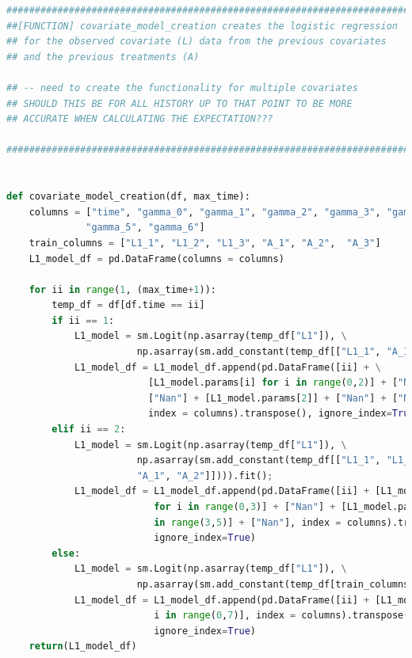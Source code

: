 \begin{lstlisting}[language=Python]
#########################################################################
##[FUNCTION] covariate_model_creation creates the logistic regression 
## for the observed covariate (L) data from the previous covariates 
## and the previous treatments (A) 

## -- need to create the functionality for multiple covariates
## SHOULD THIS BE FOR ALL HISTORY UP TO THAT POINT TO BE MORE 
## ACCURATE WHEN CALCULATING THE EXPECTATION??? 

#########################################################################


def covariate_model_creation(df, max_time): 
    columns = ["time", "gamma_0", "gamma_1", "gamma_2", "gamma_3", "gamma_4", \
              "gamma_5", "gamma_6"]
    train_columns = ["L1_1", "L1_2", "L1_3", "A_1", "A_2",  "A_3"]
    L1_model_df = pd.DataFrame(columns = columns)

    for ii in range(1, (max_time+1)): 
        temp_df = df[df.time == ii] 
        if ii == 1: 
            L1_model = sm.Logit(np.asarray(temp_df["L1"]), \
                       np.asarray(sm.add_constant(temp_df[["L1_1", "A_1"]]))).fit(); 
            L1_model_df = L1_model_df.append(pd.DataFrame([ii] + \
                         [L1_model.params[i] for i in range(0,2)] + ["Nan"] + \
                         ["Nan"] + [L1_model.params[2]] + ["Nan"] + ["Nan"], \
                         index = columns).transpose(), ignore_index=True)
        elif ii == 2: 
            L1_model = sm.Logit(np.asarray(temp_df["L1"]), \
                       np.asarray(sm.add_constant(temp_df[["L1_1", "L1_2", \
                       "A_1", "A_2"]]))).fit(); 
            L1_model_df = L1_model_df.append(pd.DataFrame([ii] + [L1_model.params[i] \
                          for i in range(0,3)] + ["Nan"] + [L1_model.params[i] for i \
                          in range(3,5)] + ["Nan"], index = columns).transpose(), \
                          ignore_index=True)
        else: 
            L1_model = sm.Logit(np.asarray(temp_df["L1"]), \
                       np.asarray(sm.add_constant(temp_df[train_columns]))).fit(); 
            L1_model_df = L1_model_df.append(pd.DataFrame([ii] + [L1_model.params[i] for \
                          i in range(0,7)], index = columns).transpose(), \
                          ignore_index=True)
    return(L1_model_df)
\end{lstlisting}

